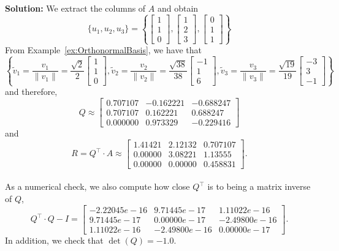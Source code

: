\textbf{Solution:} We extract the columns of $A$ and obtain
\begin{equation*}
	\{ u_1, u_2, u_3\} = \left\{
		\left[ \begin{array}{c} 1 \\ 1 \\ 0 \end{array} \right],
		\left[ \begin{array}{c} 1 \\ 2 \\ 3 \end{array} \right],
		\left[ \begin{array}{c} 0 \\ 1 \\ 1 \end{array} \right]
		\right\}
\end{equation*}
From Example~\ref{ex:OrthonormalBasis}, we have that\
$$
\left\{ 
		\tilde{v}_1 = \frac{v_1}{\| v_1 \|} = \frac{\sqrt{2}}{2} \left[ \begin{array}{c} 1  \\ 1  \\ 0 \end{array} \right], 
		\tilde{v}_2 = \frac{v_2}{\| v_2 \|} = \frac{\sqrt{38}}{38} \left[ \begin{array}{r} -1 \\ 1 \\ 6  \end{array} \right], 
		\tilde{v}_3 = \frac{v_3}{\| v_3 \|} = \frac{\sqrt{19}}{19} \left[ \begin{array}{r} -3  \\ 3\\ -1 \end{array} \right]
\right\}
$$	
and therefore,
$$Q\approx \left[ \begin{array}{rrr} 
 0.707107 &  -0.162221  & -0.688247 \\
 0.707107  &  0.162221  & 0.688247\\
 0.000000  &       0.973329   & -0.229416
  \end{array} \right]$$
  and
$$R = Q^\top \cdot A \approx   \left[ \begin{array}{ccc} 
1.41421  &    2.12132    & 0.707107 \\
0.00000 & 3.08221    &   1.13555 \\
0.00000 &  0.00000 & 0.458831
  \end{array} \right].$$\\

  As a numerical check, we also compute how close $Q^\top$ is to being a matrix inverse of $Q$,
  $$Q^\top \cdot Q- I=  \left[ \begin{array}{rrr}
 -2.22045e-16 &  9.71445e-17  & 1.11022e-16\\
  9.71445e-17  & 0.00000  e-17    &    -2.49800e-16\\
  1.11022e-16 & -2.49800e-16  &    0.00000  e-17
 \end{array} \right].$$
 In addition, we check that $\det(Q)=-1.0$.
\Qed \\

